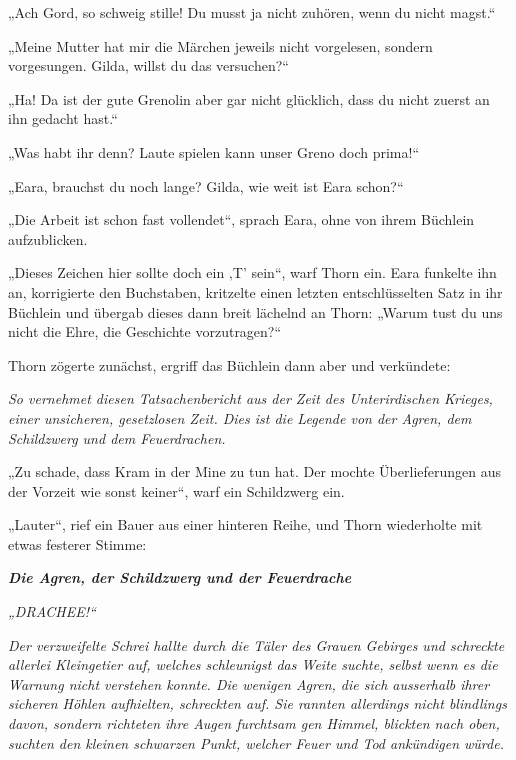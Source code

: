„Ach Gord, so schweig stille! Du musst ja nicht zuhören, wenn du nicht magst.“

„Meine Mutter hat mir die Märchen jeweils nicht vorgelesen, sondern vorgesungen. Gilda, willst du das versuchen?“

„Ha! Da ist der gute Grenolin aber gar nicht glücklich, dass du nicht zuerst an ihn gedacht hast.“

„Was habt ihr denn? Laute spielen kann unser Greno doch prima!“

„Eara, brauchst du noch lange? Gilda, wie weit ist Eara schon?“

„Die Arbeit ist schon fast vollendet“, sprach Eara, ohne von ihrem Büchlein aufzublicken.

„Dieses Zeichen hier sollte doch ein ‚T’ sein“, warf Thorn ein. Eara funkelte ihn an, korrigierte den Buchstaben, kritzelte einen letzten entschlüsselten Satz in ihr Büchlein und übergab dieses dann breit lächelnd an Thorn: „Warum tust du uns nicht die Ehre, die Geschichte vorzutragen?“

Thorn zögerte zunächst, ergriff das Büchlein dann aber und verkündete:\bigskip



\textit{So vernehmet diesen Tatsachenbericht aus der Zeit des Unterirdischen Krieges, einer unsicheren, gesetzlosen Zeit. Dies ist die Legende von der Agren, dem Schildzwerg und dem Feuerdrachen.}\bigskip



„Zu schade, dass Kram in der Mine zu tun hat. Der mochte Überlieferungen aus der Vorzeit wie sonst keiner“, warf ein Schildzwerg ein.

„Lauter“, rief ein Bauer aus einer hinteren Reihe, und Thorn wiederholte mit etwas festerer Stimme:\bigskip



\textbf{\textit{Die Agren, der Schildzwerg und der Feuerdrache}}\bigskip



\textit{„DRACHEE!“}

\textit{Der verzweifelte Schrei hallte durch die Täler des Grauen Gebirges und schreckte allerlei Kleingetier auf, welches schleunigst das Weite suchte, selbst wenn es die Warnung nicht verstehen konnte. Die wenigen Agren, die sich ausserhalb ihrer sicheren Höhlen aufhielten, schreckten auf. Sie rannten allerdings nicht blindlings davon, sondern richteten ihre Augen furchtsam gen Himmel, blickten nach oben, suchten den kleinen schwarzen Punkt, welcher Feuer und Tod ankündigen würde.}

